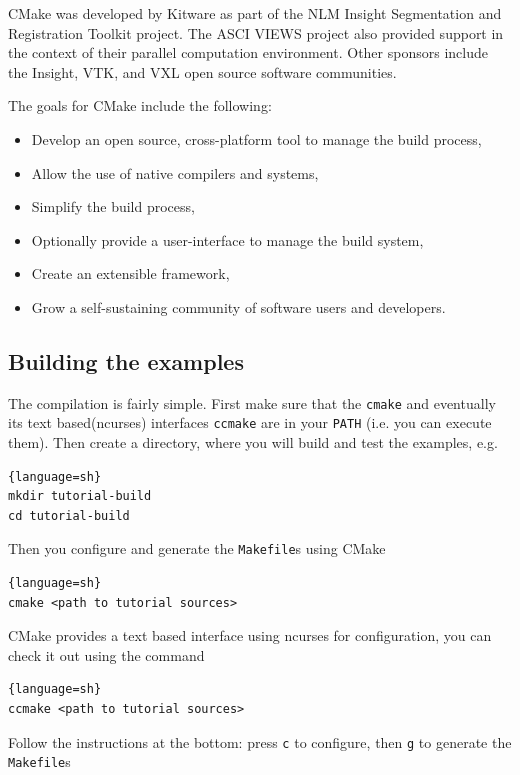 \documentclass[11pt]{article}
\begin{document}
CMake was developed by Kitware as part of the NLM Insight Segmentation
and Registration Toolkit project. The ASCI VIEWS project also provided
support in the context of their parallel computation
environment. Other sponsors include the Insight, VTK, and VXL open
source software communities.

The goals for CMake include the following:

\begin{itemize}
\item Develop an open source, cross-platform tool to manage the build process,
\item Allow the use of native compilers and systems,
\item Simplify the build process,
\item Optionally provide a user-interface to manage the build system,
\item Create an extensible framework,
\item Grow a self-sustaining community of software users and developers.
\end{itemize}

\subsection{Building the examples}
\label{sec:building-examples}

The compilation is fairly simple. First make sure that the
\lstinline!cmake! and eventually its text based(ncurses) interfaces
\lstinline!ccmake! are in your \lstinline!PATH! (i.e. you can execute
them).
\noindent
Then create a directory, where you will build and test the examples, e.g.
\begin{lstlisting}{language=sh}
mkdir tutorial-build
cd tutorial-build
\end{lstlisting}

\noindent
Then you configure and generate the \lstinline!Makefile!s using CMake
\begin{lstlisting}{language=sh}
cmake <path to tutorial sources>
\end{lstlisting}
\noindent
CMake provides a text based interface using ncurses for configuration,
you can check it out using the command
\begin{lstlisting}{language=sh}
ccmake <path to tutorial sources>
\end{lstlisting}
\noindent Follow the instructions at the bottom: press \lstinline!c!
to configure, then \lstinline!g! to generate the \lstinline!Makefile!s
\end{document}
